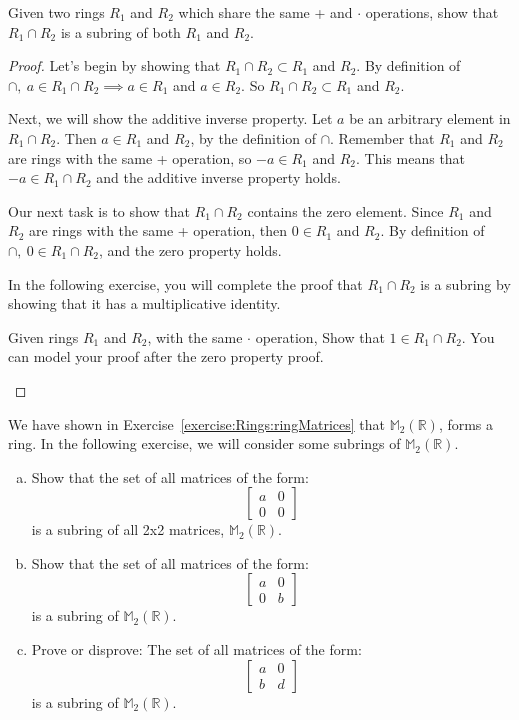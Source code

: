 \begin{example}{}
Given two rings $R_1$ and $R_2$ which share the same + and $\cdot$ operations, show that $R_1 \cap R_2$ is a subring of both $R_1$ and $R_2$.

\begin{proof}
Let's begin by showing that $R_1 \cap R_2\subset R_1$ and $R_2$.  By definition of $\cap, ~a\in R_1\cap R_2\implies a\in R_1$ and $a\in R_2$. So  $R_1 \cap R_2\subset R_1$ and $R_2$. 

Next, we will show the additive inverse property. Let $a$ be an arbitrary element in $R_1 \cap R_2$. Then $a\in R_1$ and $R_2$, by the definition of $\cap$. Remember that $R_1$ and $R_2$ are rings with the same + operation, so $-a\in R_1$ and $R_2$.  This means that $-a\in R_1 \cap R_2$ and the additive inverse property holds.

Our next task is to show that $R_1 \cap R_2$ contains the zero element. Since $R_1$ and $R_2$ are rings with the same + operation, then $0\in R_1$ and $R_2$.  By definition of $\cap, ~0\in R_1 \cap R_2$, and the zero property holds.

In the following exercise, you will complete the proof that $R_1\cap R_2$ is a subring by showing that it has a multiplicative identity.

\begin{exercise}{}
Given rings $R_1$ and $R_2$, with the same $\cdot$ operation, Show that $1\in R_1 \cap R_2$. You can model your proof after the zero property proof.
\end{exercise}
\end{proof}
\end{example}
We have shown in Exercise~\ref{exercise:Rings:ringMatrices} that ${\mathbb M}_2({\mathbb R})$, forms a ring.  In the following exercise, we will consider some subrings of ${\mathbb M}_2({\mathbb R})$.


\begin{exercise}{}
\begin{enumerate}[(a)]
\item
Show that the set of all matrices of the form:
$$
\begin{bmatrix}
a & 0\\
0 & 0
\end{bmatrix}
$$
is a subring of all 2x2 matrices, ${\mathbb M}_2({\mathbb R})$.
\item
Show that the set of all matrices of the form:
$$
\begin{bmatrix}
a & 0\\
0 & b
\end{bmatrix}
$$
is a subring of ${\mathbb M}_2({\mathbb R})$.
\item
Prove or disprove: The set of all matrices of the form:
$$
\begin{bmatrix}
a & 0\\
b & d
\end{bmatrix}
$$
is a subring of  ${\mathbb M}_2({\mathbb R})$.
\end{enumerate}
\end{exercise}

